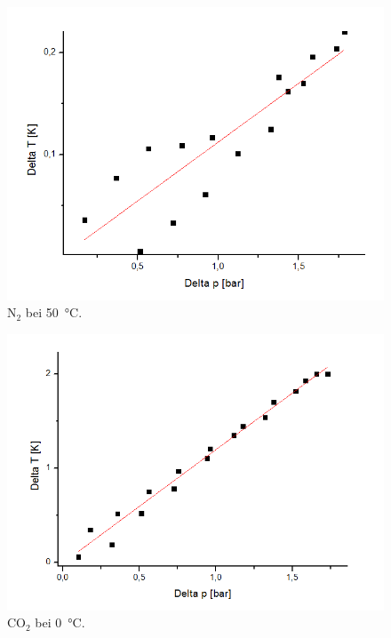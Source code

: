 \documentclass[a4paper,12pt,oneside,onecolum,final,openany]{report}
\begin{document}
\begin{center}
\begin{figure}[h]
\includegraphics[width=13.5cm]{N2bei50.png}
\caption{$\text{N}_2$ bei 50~°C.}
\end{figure}
\end{center}
\begin{center}
\begin{figure}[h]
\includegraphics[width=13.5cm]{CO20Grad.png}
\caption{$\text{CO}_2$ bei 0~°C.}
\end{figure}
\end{center}
\end{document}
